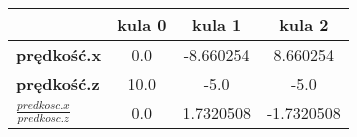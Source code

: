 \begin{tabular}{|l|c|c|c|}
\hline
 & \textbf{kula 0} & \textbf{kula 1} & \textbf{kula 2} \\
 \hline
 \textbf{prędkość.x} & 0.0 & -8.660254 & 8.660254 \\
 \hline
 \textbf{prędkość.z} & 10.0 & -5.0 & -5.0 \\
 \hline
 \textbf{$ \frac{predkosc.x}{predkosc.z} $} & 0.0 & 1.7320508 & -1.7320508 \\
 \hline
\end{tabular}